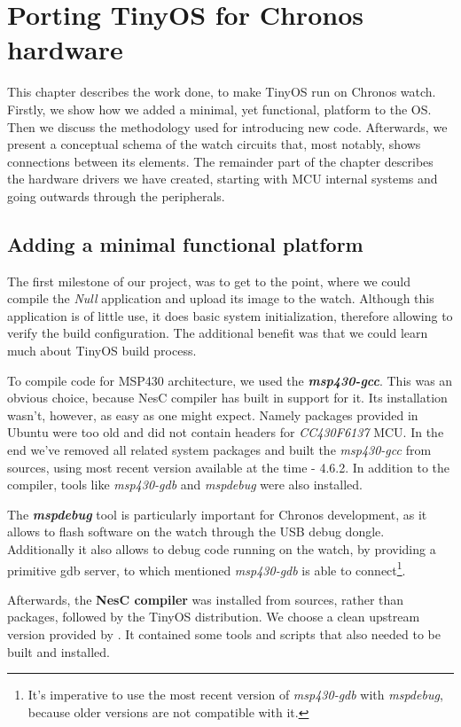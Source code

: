 \chapter{Porting TinyOS for Chronos hardware}

This chapter describes the work done, to make TinyOS run on Chronos watch. Firstly, we show how we added a minimal, yet functional, platform to the OS. Then we discuss the methodology used for introducing new code. Afterwards, we present a conceptual schema of the watch circuits that, most notably, shows connections between its elements. The remainder part of the chapter describes the hardware drivers we have created, starting with MCU internal systems and going outwards through the peripherals.

\section{Adding a minimal functional platform}

The first milestone of our project, was to get to the point, where we could compile the \emph{Null} application and upload its image to the watch. Although this application is of little use, it does basic system initialization, therefore allowing to verify the build configuration. The additional benefit was that we could learn much about TinyOS build process.

To compile code for MSP430 architecture, we used the \emph{\bf msp430-gcc}. This was an obvious choice, because NesC compiler has built in support for it. Its installation wasn't, however, as easy as one might expect. Namely packages provided in Ubuntu were too old and did not contain headers for \emph{CC430F6137} MCU. In the end we've removed all related system packages and built the \emph{msp430-gcc} from sources, using most recent version available at the time - 4.6.2.  In addition to the compiler, tools like \emph{msp430-gdb} and \emph{mspdebug} were also installed.

The \emph{\bf mspdebug} tool is particularly important for Chronos development, as it allows to flash software on the watch through the USB debug dongle.  Additionally it also allows to debug code running on the watch, by providing a primitive gdb server, to which mentioned \emph{msp430-gdb} is able to connect\footnote{It's imperative to use the most recent version of \emph{msp430-gdb} with \emph{mspdebug}, because older versions are not compatible with it.}.

Afterwards, the {\bf NesC compiler} was installed from sources, rather than packages, followed by the TinyOS distribution. We choose a clean upstream version provided by \cite{TOSnet}. It contained some tools and scripts that also needed to be built and installed.

